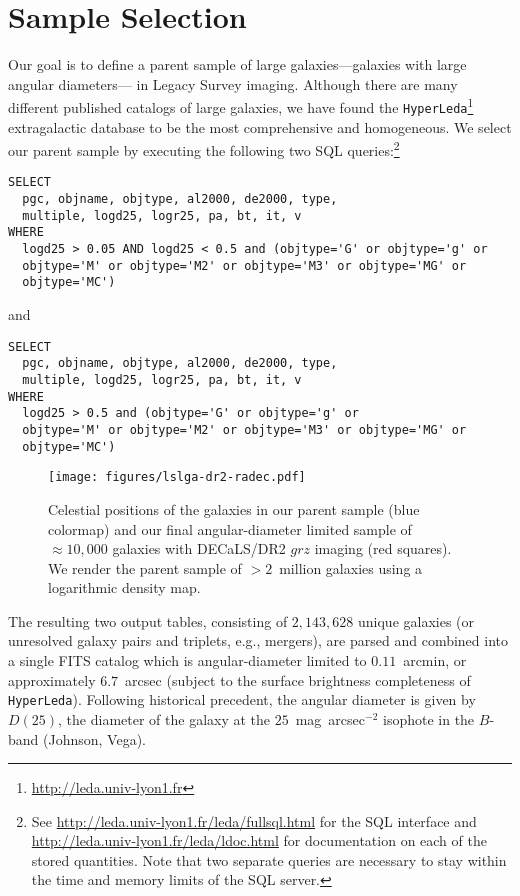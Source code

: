 \section{Sample Selection}\label{sec:sample}

Our goal is to define a parent sample of large galaxies---galaxies with large
angular diameters--- in Legacy Survey imaging.
Although there are many different published catalogs of large galaxies, we have
found the {\tt HyperLeda}\footnote{\url{http://leda.univ-lyon1.fr}}
extragalactic database to be the most comprehensive and homogeneous.  We select
our parent sample by executing the following two SQL queries:\footnote{See
  \url{http://leda.univ-lyon1.fr/leda/fullsql.html} for the SQL interface and
  \url{http://leda.univ-lyon1.fr/leda/ldoc.html} for documentation on each of
  the stored quantities.  Note that two separate queries are necessary to stay
  within the time and memory limits of the SQL server.  }

\begin{verbatim}
SELECT
  pgc, objname, objtype, al2000, de2000, type, 
  multiple, logd25, logr25, pa, bt, it, v
WHERE 
  logd25 > 0.05 AND logd25 < 0.5 and (objtype='G' or objtype='g' or 
  objtype='M' or objtype='M2' or objtype='M3' or objtype='MG' or 
  objtype='MC')
\end{verbatim}

\noindent and

\begin{verbatim}
SELECT
  pgc, objname, objtype, al2000, de2000, type, 
  multiple, logd25, logr25, pa, bt, it, v
WHERE 
  logd25 > 0.5 and (objtype='G' or objtype='g' or 
  objtype='M' or objtype='M2' or objtype='M3' or objtype='MG' or 
  objtype='MC')
\end{verbatim}

\begin{figure}[!ht]
\centering
\texttt{[image: figures/lslga-dr2-radec.pdf]}
\caption{Celestial positions of the galaxies in our parent sample (blue
  colormap) and our final angular-diameter limited sample of $\approx10,000$
  galaxies with DECaLS/DR2 $grz$ imaging (red squares).  We render the parent
  sample of $>2$~million galaxies using a logarithmic density
  map. \label{fig:radec}}
\end{figure}

\noindent The resulting two output tables, consisting of $2,143,628$ unique
galaxies (or unresolved galaxy pairs and triplets, e.g., mergers), are parsed
and combined into a single FITS catalog which is angular-diameter limited to
$0.11$~arcmin, or approximately $6.7$~arcsec (subject to the surface brightness
completeness of {\tt HyperLeda}).  Following historical precedent, the angular
diameter is given by $D(25)$, the diameter of the galaxy at the
$25$~mag~arcsec$^{-2}$ isophote in the $B$-band (Johnson, Vega).

